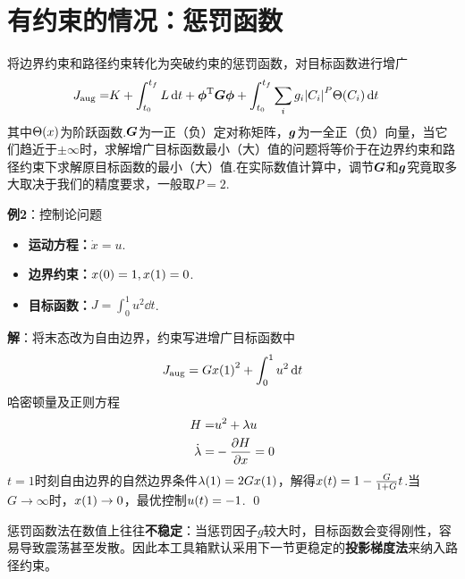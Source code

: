 \documentclass[UTF8]{article}
\numberwithin{equation}{section}
\begin{document}
    \section{有约束的情况：惩罚函数}
        将边界约束和路径约束转化为突破约束的惩罚函数，对目标函数进行增广
        \begin{align}
            J_\text{aug}=&K+\int_{t_0}^{t_f}L\dd{t}
            +\vb*{\phi}^\text{T}\vb*{G}\vb*{\phi}+\int_{t_0}^{t_f}\sum_{i}g_i\abs{C_i}^P\Theta\pqty{C_i}\dd{t}
        \end{align}
        其中$\Theta\pqty{x}$为阶跃函数.$\vb*{G}$为一正（负）定对称矩阵，$\vb*{g}$为一全正（负）向量，当它们趋近于$\pm\infty$时，求解增广目标函数最小（大）值的问题将等价于在边界约束和路径约束下求解原目标函数的最小（大）值.在实际数值计算中，调节$\vb*{G}$和$\vb*{g}$究竟取多大取决于我们的精度要求，一般取$P=2$.
        \par
        {\color{blue}
            \textbf{例2}：控制论问题
            \begin{itemize}
                \item \textbf{运动方程：}$\dot{x}=u$.
                \item \textbf{边界约束：}$x\pqty{0}=1,x\pqty{1}=0$.
                \item \textbf{目标函数：}$J=\int_{0}^{1}u^2\dd{t}$.
            \end{itemize}
            \par
            \textbf{解}：将末态改为自由边界，约束写进增广目标函数中
            \begin{align}
                J_\text{aug}=Gx\pqty{1}^2+\int_{0}^{1}u^2\dd{t}
            \end{align}
            哈密顿量及正则方程
            \begin{align}
                H=&u^2+\lambda u\\
                \dot{\lambda}=&-\pdv{H}{x}=0
            \end{align}
            $t=1$时刻自由边界的自然边界条件$\lambda\pqty{1}=2Gx\pqty{1}$，解得$x\pqty{t}=1-\frac{G}{1+G}t$.当$G\to\infty$时，$x\pqty{1}\to0$，最优控制$u\pqty{t}=-1$.
            \qed
        }
        \par
        惩罚函数法在数值上往往\textbf{不稳定}：当惩罚因子$g$较大时，目标函数会变得刚性，容易导致震荡甚至发散。因此本工具箱默认采用下一节更稳定的\textbf{投影梯度法}来纳入路径约束。
\end{document}
